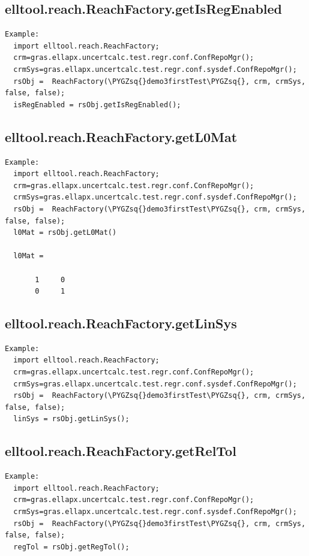 \documentclass[letterpaper,10pt,english]{sphinxmanual}
\def\PYGZsq{\char`\'}
\begin{document}
\subsection{elltool.reach.ReachFactory.getIsRegEnabled}
\label{chap_functions:elltool-reach-reachfactory-getisregenabled}
\begin{Verbatim}[commandchars=\\\{\}]
Example:
  import elltool.reach.ReachFactory;
  crm=gras.ellapx.uncertcalc.test.regr.conf.ConfRepoMgr();
  crmSys=gras.ellapx.uncertcalc.test.regr.conf.sysdef.ConfRepoMgr();
  rsObj =  ReachFactory(\PYGZsq{}demo3firstTest\PYGZsq{}, crm, crmSys, false, false);
  isRegEnabled = rsObj.getIsRegEnabled();
\end{Verbatim}


\subsection{elltool.reach.ReachFactory.getL0Mat}
\label{chap_functions:elltool-reach-reachfactory-getl0mat}
\begin{Verbatim}[commandchars=\\\{\}]
Example:
  import elltool.reach.ReachFactory;
  crm=gras.ellapx.uncertcalc.test.regr.conf.ConfRepoMgr();
  crmSys=gras.ellapx.uncertcalc.test.regr.conf.sysdef.ConfRepoMgr();
  rsObj =  ReachFactory(\PYGZsq{}demo3firstTest\PYGZsq{}, crm, crmSys, false, false);
  l0Mat = rsObj.getL0Mat()

  l0Mat =

       1     0
       0     1
\end{Verbatim}


\subsection{elltool.reach.ReachFactory.getLinSys}
\label{chap_functions:elltool-reach-reachfactory-getlinsys}
\begin{Verbatim}[commandchars=\\\{\}]
Example:
  import elltool.reach.ReachFactory;
  crm=gras.ellapx.uncertcalc.test.regr.conf.ConfRepoMgr();
  crmSys=gras.ellapx.uncertcalc.test.regr.conf.sysdef.ConfRepoMgr();
  rsObj =  ReachFactory(\PYGZsq{}demo3firstTest\PYGZsq{}, crm, crmSys, false, false);
  linSys = rsObj.getLinSys();
\end{Verbatim}


\subsection{elltool.reach.ReachFactory.getRelTol}
\label{chap_functions:elltool-reach-reachfactory-getreltol}
\begin{Verbatim}[commandchars=\\\{\}]
Example:
  import elltool.reach.ReachFactory;
  crm=gras.ellapx.uncertcalc.test.regr.conf.ConfRepoMgr();
  crmSys=gras.ellapx.uncertcalc.test.regr.conf.sysdef.ConfRepoMgr();
  rsObj =  ReachFactory(\PYGZsq{}demo3firstTest\PYGZsq{}, crm, crmSys, false, false);
  regTol = rsObj.getRegTol();
\end{Verbatim}
\end{document}
